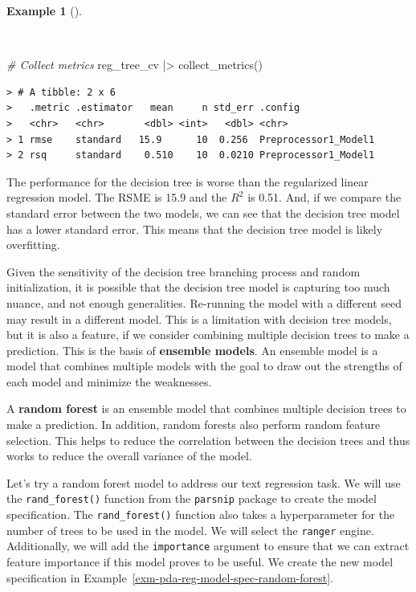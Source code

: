 \documentclass[
  letterpaper,
]{latex/krantz}
\newenvironment{Shaded}{\begin{snugshade}}{\end{snugshade}}
\newcommand{\CommentTok}[1]{\textcolor[rgb]{0.00,0.00,0.00}{\textit{#1}}}
\newcommand{\FunctionTok}[1]{\textcolor[rgb]{0.00,0.00,0.00}{#1}}
\newcommand{\NormalTok}[1]{\textcolor[rgb]{0.00,0.00,0.00}{#1}}
\newcommand{\SpecialCharTok}[1]{\textcolor[rgb]{0.00,0.00,0.00}{#1}}
\theoremstyle{definition}
\newtheorem{example}{Example}[chapter]
\theoremstyle{remark}
\begin{document}
\begin{example}[]\protect\hypertarget{exm-pda-reg-metrics-tree}{}\label{exm-pda-reg-metrics-tree}

~

\begin{Shaded}
\begin{Highlighting}[]
\CommentTok{\# Collect metrics}
\NormalTok{reg\_tree\_cv }\SpecialCharTok{|\textgreater{}} \FunctionTok{collect\_metrics}\NormalTok{()}
\end{Highlighting}
\end{Shaded}

\begin{verbatim}
> # A tibble: 2 x 6
>   .metric .estimator   mean     n std_err .config             
>   <chr>   <chr>       <dbl> <int>   <dbl> <chr>               
> 1 rmse    standard   15.9      10  0.256  Preprocessor1_Model1
> 2 rsq     standard    0.510    10  0.0210 Preprocessor1_Model1
\end{verbatim}

\end{example}

The performance for the decision tree is worse than the regularized
linear regression model. The RSME is 15.9 and the \(R^2\) is 0.51. And,
if we compare the standard error between the two models, we can see that
the decision tree model has a lower standard error. This means that the
decision tree model is likely overfitting.

Given the sensitivity of the decision tree branching process and random
initialization, it is possible that the decision tree model is capturing
too much nuance, and not enough generalities. Re-running the model with
a different seed may result in a different model. This is a limitation
with decision tree models, but it is also a feature, if we consider
combining multiple decision trees to make a prediction. This is the
basis of \textbf{ensemble models}. An ensemble model is a model that
combines multiple models with the goal to draw out the strengths of each
model and minimize the weaknesses.

A \textbf{random forest} is an ensemble model that combines multiple
decision trees to make a prediction. In addition, random forests also
perform random feature selection. This helps to reduce the correlation
between the decision trees and thus works to reduce the overall variance
of the model.

Let's try a random forest model to address our text regression task. We
will use the \texttt{rand\_forest()} function from the \texttt{parsnip}
package to create the model specification. The \texttt{rand\_forest()}
function also takes a hyperparameter for the number of trees to be used
in the model. We will select the \texttt{ranger} engine. Additionally,
we will add the \texttt{importance} argument to ensure that we can
extract feature importance if this model proves to be useful. We create
the new model specification in
Example~\ref{exm-pda-reg-model-spec-random-forest}.
\end{document}
